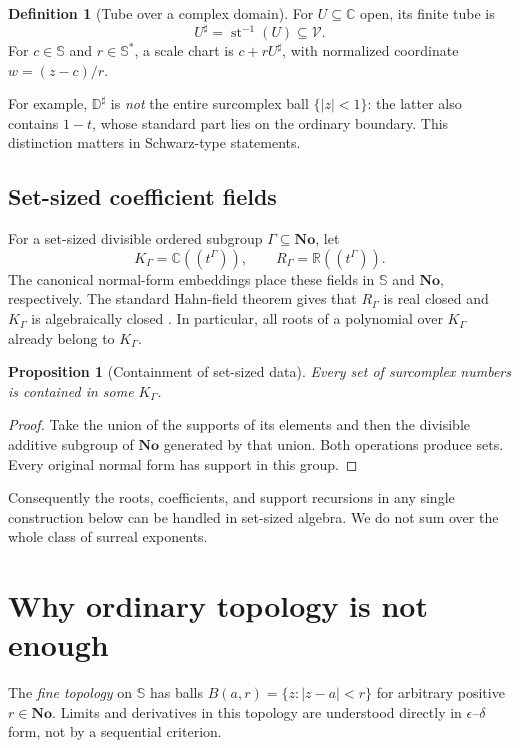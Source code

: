 \documentclass[11pt,a4paper]{article}
\newtheorem{proposition}[theorem]{Proposition}
\theoremstyle{definition}
\newtheorem{definition}[theorem]{Definition}
\theoremstyle{remark}
\newcommand{\No}{\mathbf{No}}
\newcommand{\SC}{\mathbb S}
\newcommand{\C}{\mathbb C}
\newcommand{\R}{\mathbb R}
\newcommand{\Fin}{\mathcal V}
\newcommand{\st}{\operatorname{st}}
\newcommand{\disk}{\mathbb D}
\begin{document}
\begin{definition}[Tube over a complex domain]\label{def:tube}
For $U\subseteq\C$ open, its finite tube is
\[
 U^\sharp=\st^{-1}(U)\subseteq\Fin.
\]
For $c\in\SC$ and $r\in\SC^*$, a scale chart is
$c+rU^\sharp$, with normalized coordinate $w=(z-c)/r$.
\end{definition}
For example, $\disk^\sharp$ is \emph{not} the entire surcomplex ball
$\{|z|<1\}$: the latter also contains $1-t$, whose standard part lies
on the ordinary boundary. This distinction matters in Schwarz-type
statements.

\subsection{Set-sized coefficient fields}
For a set-sized divisible ordered subgroup $\Gamma\subseteq\No$,
let
\[
 K_\Gamma=\C((t^\Gamma)),\qquad
 R_\Gamma=\R((t^\Gamma)).
\]
The canonical normal-form embeddings place these fields in $\SC$ and
$\No$, respectively. The standard Hahn-field theorem gives that
$R_\Gamma$ is real closed and $K_\Gamma$ is algebraically closed
\cite{Poonen}. In particular, all roots of a polynomial over
$K_\Gamma$ already belong to $K_\Gamma$.

\begin{proposition}[Containment of set-sized data]\label{prop:fragment}
Every set of surcomplex numbers is contained in some $K_\Gamma$.
\end{proposition}
\begin{proof}
Take the union of the supports of its elements and then the divisible
additive subgroup of $\No$ generated by that union. Both operations
produce sets. Every original normal form has support in this group.
\end{proof}
Consequently the roots, coefficients, and support recursions in any
single construction below can be handled in set-sized algebra. We do
not sum over the whole class of surreal exponents.

\section{Why ordinary topology is not enough}\label{sec:topology}
The \emph{fine topology} on $\SC$ has balls
$B(a,r)=\{z:|z-a|<r\}$ for arbitrary positive $r\in\No$.
Limits and derivatives in this topology are understood directly in
$\epsilon$--$\delta$ form, not by a sequential criterion.
\end{document}
